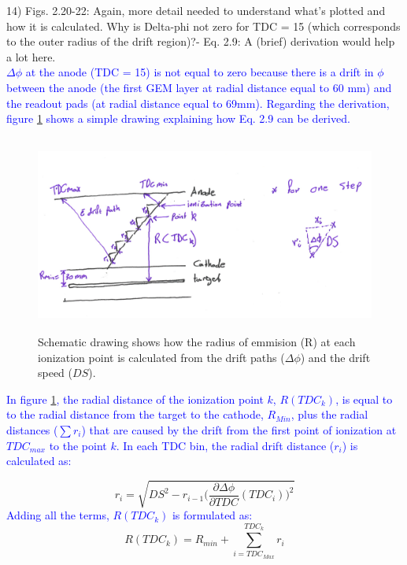 14) Figs. 2.20-22: Again, more detail needed to understand what's plotted and 
how it is calculated. Why is Delta-phi not zero for TDC = 15 (which corresponds 
to the outer radius of the drift region)?- Eq. 2.9: A (brief) derivation would 
help a lot here.\\
\textcolor{blue}{
$\Delta \phi$ at the anode (TDC = 15) is not equal to zero because there is a 
drift in $\phi$ between the anode (the first GEM layer at radial distance equal to 
60 mm) and the readout pads (at radial distance equal to 69mm). Regarding the 
derivation, figure \ref{fig:drift_derive} shows a simple drawing explaining how 
Eq. 2.9 can be derived.}\\

\begin{figure}[!h]
   \centering
   \includegraphics[height=6.5cm]{fig/deriv_R_drift.png}
   \caption{Schematic drawing shows how the radius of emmision (R) at each 
   ionization point is calculated from the drift paths ($\Delta \phi$) and the 
drift speed ($DS$).}
   \label{fig:drift_derive}
\end{figure}
\textcolor{blue}{In figure \ref{fig:drift_derive}, the radial distance of the 
   ionization point $k$, $R(TDC_{k})$, is equal to to the radial distance from 
   the target to the cathode, $R_{Min}$, plus the radial distances ($\sum 
   r_{i}$) that are caused by the drift from the first point of ionization at 
   $TDC_{max}$ to the point $k$. In each TDC bin, the radial drift distance 
($r_{i}$) is calculated as:}

   \begin{equation}
      r_{i} = \sqrt{DS^{2} - r_{i-1}  \bigg(\frac{\partial \Delta \phi} 
      {\partial TDC}(TDC_i) \bigg)^{2} }
\end{equation}
\textcolor{blue}{Adding all the terms, $R(TDC_{k})$ is formulated as:}
\begin{equation}
   R (TDC_{k}) = R_{min} + \sum\limits_{i=TDC_{Max}}^{TDC_{k}} r_{i}
\end{equation}

